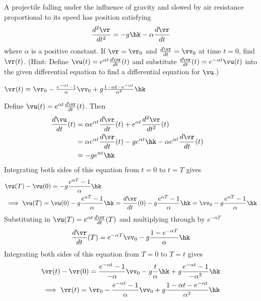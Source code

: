 \begin{question}A projectile falling under the influence of gravity and slowed
by air resistance proportional to its speed has position satisfying
$$
\frac{d^2\vr}{dt^2}=-g\hk-\alpha\frac{d\vr}{dt}
$$
where $\alpha$ is a positive constant. If $\vr=\vr_0$ and 
$\frac{d\vr}{dt}=\vv_0$ at time $t=0$, find $\vr(t)$.
(Hint: Define $\vu(t)=e^{\alpha t}\frac{d\vr}{dt}(t)$ and substitute
$\frac{d\vr}{dt}(t)=e^{-\alpha t}\vu(t)$ into the given 
differential equation to find a differential equation for $\vu$.)
\end{question}


\begin{answer}
$\vr(t)=\vr_0-\frac{e^{-\alpha t}-1}{\alpha}\vv_0
+g\frac{1-\alpha t-e^{-\alpha t}}{\alpha^2}\hk$
\end{answer}
\begin{solution}
Define $\vu(t)=e^{\alpha t}\frac{d\vr}{dt}(t)$. Then
\begin{align*}
\frac{d\vu}{dt}(t)&=\alpha e^{\alpha t}\frac{d\vr}{dt}(t)
+e^{\alpha t}\frac{d^2\vr}{dt^2}(t)\cr
&=\alpha e^{\alpha t}\frac{d\vr}{dt}(t)
-ge^{\alpha t}\hk
-\alpha e^{\alpha t}\frac{d\vr}{dt}(t)\cr
&=-ge^{\alpha t}\hk\cr
\end{align*}
Integrating both sides of this equation from $t=0$ to $t=T$ gives
\begin{align*}
&\vu(T)-\vu(0)=-g\frac{e^{\alpha T}-1}{\alpha}\hk \\
&\implies 
\vu(T)=\vu(0)-g\frac{e^{\alpha T}-1}{\alpha}\hk
=\frac{d\vr}{dt}(0)-g\frac{e^{\alpha T}-1}{\alpha}\hk
=\vv_0-g\frac{e^{\alpha T}-1}{\alpha}\hk
\end{align*}
Substituting in $\vu(T)=e^{\alpha t}\frac{d\vr}{dt}(T)$ and multiplying
through by $e^{-\alpha T}$
$$
\frac{d\vr}{dt}(T)
=e^{-\alpha T}\vv_0-g\frac{1-e^{-\alpha T}}{\alpha}\hk
$$
Integrating both sides of this equation from $T=0$ to $T=t$ gives
\begin{align*}
&\vr(t)-\vr(0)
=\frac{e^{-\alpha t}-1}{-\alpha}\vv_0-g\frac{ t}{\alpha}\hk
+g\frac{e^{-\alpha t}-1}{-\alpha^2}\hk \\
&\implies \vr(t)=\vr_0-\frac{e^{-\alpha t}-1}{\alpha}\vv_0
+g\frac{1-\alpha t-e^{-\alpha t}}{\alpha^2}\hk
\end{align*}
\end{solution}


